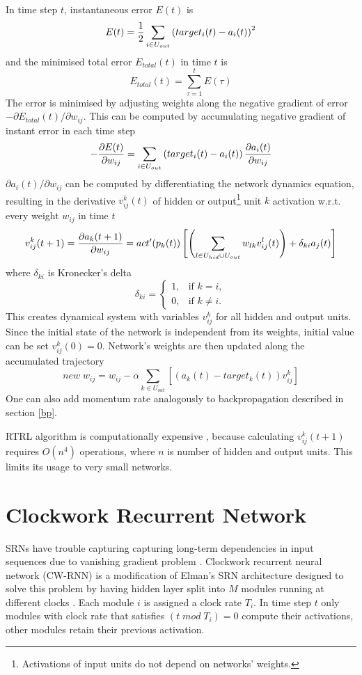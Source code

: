 \documentclass[12pt,oneside]{fithesis2}
\begin{document}
In time step $t$, instantaneous error $E(t)$ is
$$E(t) = {1 \over 2}\sum\limits_{i \in U_{out}}\left(target_i(t) - a_i(t)\right)^2$$
and the minimised total error $E_{total}(t)$ in time $t$  is
$$E_{total}(t) =\sum\limits_{\tau=1}^t E(\tau)$$
The error is minimised by adjusting weights along the negative gradient of error $-\partial E_{total}(t) / \partial w_{ij}$. This can be computed by accumulating negative gradient of instant error in each time step
$$-{{\partial E(t)} \over {\partial w_{ij}}} = \sum\limits_{i \in U_{out}} \left( target_i(t) - a_i(t) \right) {{\partial a_i(t)} \over {\partial w_{ij}}}$$
${\partial a_i(t)} / {\partial w_{ij}}$ can be computed by differentiating the network dynamics equation, resulting in the derivative $v^k_{ij}(t)$ of hidden or output\footnote{Activations of input units do not depend on networks' weights.} unit $k$ activation w.r.t. every weight $w_{ij}$ in time $t$
$$ v^k_{ij}(t+1) = {{\partial a_k(t+1)} \over {\partial w_{ij}}} = act'(p_k(t)) \left[ \left(\sum\limits_{l \in U_{hid} \cup U_{out}}  w_{lk}  v_{ij}^l(t)\right) + \delta_{ki} a_j(t) \right] $$
where $\delta_{ki}$ is Kronecker's delta
$$\delta_{ki} =
    \begin{cases}
            1, &         \text{if } k=i,\\
            0, &         \text{if } k\neq i.
    \end{cases}$$
This creates dynamical system with variables $v^k_{ij}$ for all hidden and output units. Since the initial state of the network is independent from its weights, initial value can be set $v^k_{ij}(0) = 0$. Network's weights are then updated along the accumulated trajectory
$$new \; w_{ij} =  w_{ij} - \alpha \sum\limits_{k \in U_{out}} \left[ \left(a_k(t) - target_k(t) \right) v_{ij}^k \right]$$
One can also add momentum rate analogously to backpropagation described in section \ref{bp}. \par

RTRL algorithm is computationally expensive \cite{minds-jacobs}, because calculating $v^k_{ij}(t+1)$ requires $O(n^4)$ operations, where $n$ is number of hidden and output units. This limits its usage to very small networks.

\section{Clockwork Recurrent Network}
SRNs have trouble capturing capturing long-term dependencies in input sequences due to vanishing gradient problem \cite{Hochreiter01gradientflow}. Clockwork recurrent neural network (CW-RNN) is a modification of Elman's SRN architecture designed to solve this problem by having hidden layer split into $M$ modules running at different clocks \cite{cw-rnn}.
Each module $i$ is assigned a clock rate $T_i$. In time step $t$ only modules with clock rate that satisfies $(t \; mod \; T_i) = 0$ compute their activations, other modules retain their previous activation.  \par
\end{document}
